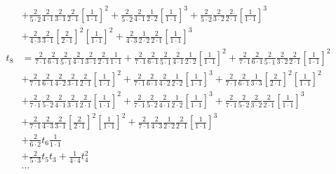 \begin{equation*}
\begin{aligned}
\\
&
+ \frac{2}{5 \cdot 2} 
  \frac{2}{4 \cdot 1}
  \frac{2}{3 \cdot 1} 
  \frac{2}{2 \cdot 1} 
  \left[
  \frac{1}{1 \cdot 1}
  \right]^2
+ \frac{2}{5 \cdot 2}
  \frac{2}{4 \cdot 1}
  \frac{1}{2 \cdot 2} 
  \left[
  \frac{1}{1 \cdot 1}
  \right]^3
+ \frac{2}{5 \cdot 2} 
  \frac{2}{3 \cdot 2} 
  \frac{2}{2 \cdot 1} 
  \left[
  \frac{1}{1 \cdot 1}
  \right]^3 
\\
&
+ \frac{2}{4 \cdot 3}
  \frac{2}{3 \cdot 1}
  \left[
  \frac{2}{2 \cdot 1}
  \right]^2
  \left[
  \frac{1}{1 \cdot 1}
  \right]^2
+ \frac{2}{4 \cdot 3}
  \frac{1}{2 \cdot 2} 
  \frac{2}{2 \cdot 1}
  \left[
  \frac{1}{1 \cdot 1}
  \right]^3
\\
t_8 &
= \frac{2}{7 \cdot 1}
  \frac{2}{6 \cdot 1}
  \frac{2}{5 \cdot 1}
  \frac{2}{4 \cdot 1}
  \frac{2}{3 \cdot 1} 
  \frac{2}{2 \cdot 1} 
  \frac{1}{1 \cdot 1} 
+ \frac{2}{7 \cdot 1}
  \frac{2}{6 \cdot 1}
  \frac{2}{5 \cdot 1}
  \frac{2}{4 \cdot 1}
  \frac{1}{2 \cdot 2} 
  \left[
  \frac{1}{1 \cdot 1}
  \right]^2
+ \frac{2}{7 \cdot 1}
  \frac{2}{6 \cdot 1}
  \frac{2}{5 \cdot 1}
  \frac{2}{3 \cdot 2} 
  \frac{2}{2 \cdot 1} 
  \left[
  \frac{1}{1 \cdot 1}
  \right]^2 
\\
&
+ \frac{2}{7 \cdot 1}
  \frac{2}{6 \cdot 1}
  \frac{2}{4 \cdot 2}
  \frac{2}{3 \cdot 1} 
  \frac{2}{2 \cdot 1} 
  \left[
  \frac{1}{1 \cdot 1}
  \right]^2
+ \frac{2}{7 \cdot 1}
  \frac{2}{6 \cdot 1}
  \frac{2}{4 \cdot 2}
  \frac{1}{2 \cdot 2} 
  \left[
  \frac{1}{1 \cdot 1}
  \right]^3
+ \frac{2}{7 \cdot 1}
  \frac{2}{6 \cdot 1}
  \frac{1}{3 \cdot 3} 
  \left[
  \frac{2}{2 \cdot 1}
  \right]^2
  \left[
  \frac{1}{1 \cdot 1}
  \right]^2 
\\
&
+ \frac{2}{7 \cdot 1}
  \frac{2}{5 \cdot 2} 
  \frac{2}{4 \cdot 1}
  \frac{2}{3 \cdot 1} 
  \frac{2}{2 \cdot 1} 
  \left[
  \frac{1}{1 \cdot 1}
  \right]^2
+ \frac{2}{7 \cdot 1}
  \frac{2}{5 \cdot 2}
  \frac{2}{4 \cdot 1}
  \frac{1}{2 \cdot 2} 
  \left[
  \frac{1}{1 \cdot 1}
  \right]^3
+ \frac{2}{7 \cdot 1}
  \frac{2}{5 \cdot 2} 
  \frac{2}{3 \cdot 2} 
  \frac{2}{2 \cdot 1} 
  \left[
  \frac{1}{1 \cdot 1}
  \right]^3 
\\
&
+ \frac{2}{7 \cdot 1}
  \frac{2}{4 \cdot 3}
  \frac{2}{3 \cdot 1}
  \left[
  \frac{2}{2 \cdot 1}
  \right]^2
  \left[
  \frac{1}{1 \cdot 1}
  \right]^2
+ \frac{2}{7 \cdot 1}
  \frac{2}{4 \cdot 3}
  \frac{1}{2 \cdot 2} 
  \frac{2}{2 \cdot 1}
  \left[
  \frac{1}{1 \cdot 1}
  \right]^3
\\
& 
+ \frac{2}{6 \cdot 2} t_6 \frac{1}{1 \cdot 1}
\\
&
+ \frac{2}{5 \cdot 3} t_5 t_3
+ \frac{1}{4 \cdot 4} t_4^2
\\
&\ldots \\
\end{aligned}
\end{equation*}
